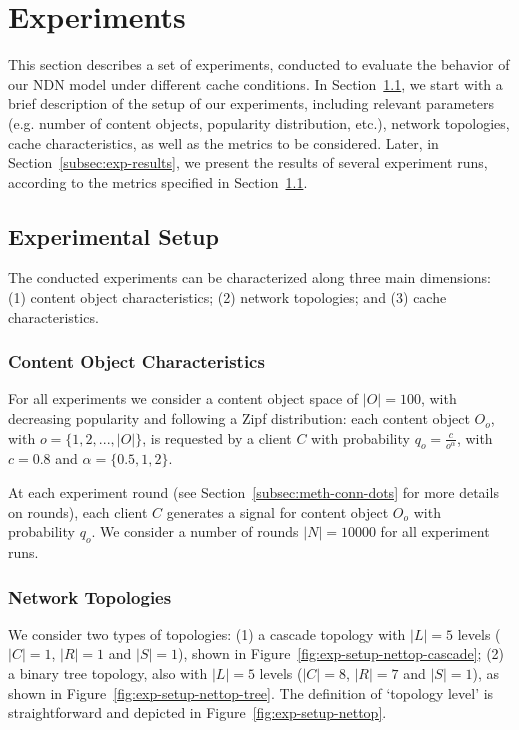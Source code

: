 \section{Experiments}
\label{sec:experiments}

This section describes a set of experiments, conducted to evaluate 
the behavior of our NDN model under different cache conditions. In 
Section~\ref{subsec:exp-setup}, we start 
with a brief description of the setup of our experiments, 
including relevant parameters (e.g. number of content objects, popularity 
distribution, etc.), network topologies, cache characteristics, as well as the 
metrics to be considered. Later, in Section~\ref{subsec:exp-results}, we 
present the results of several experiment runs, according to the metrics 
specified in Section~\ref{subsec:exp-setup}.

\subsection{Experimental Setup}
\label{subsec:exp-setup}

The conducted experiments can be characterized along three main dimensions: (1) 
content object characteristics; (2) network topologies; and (3) cache 
characteristics.\shortvertbreak

\subsubsection{Content Object Characteristics}
\label{subsec:exp-setup-cobj}

For all experiments we consider a content object space of 
$|O| = 100$, with decreasing popularity and following a Zipf distribution: 
each content object $O_o$, with $o = \{1,2,...,|O|\}$, is requested by a client 
$C$ with probability $q_{o} = \frac{c}{o^{\alpha}}$, with $c = 0.8$ and 
$\alpha = \{0.5, 1, 2\}$.\shortvertbreak

At each experiment round (see Section~\ref{subsec:meth-conn-dots} for more details on 
rounds), each client $C$ generates a signal for content object $O_o$ with 
probability $q_{o}$. We consider a number of rounds 
$|N| = 10000$ for all experiment runs.\shortvertbreak

\subsubsection{Network Topologies}
\label{subsec:exp-setup-nettop}

We consider two types of topologies: (1) a cascade topology with $|L| = 5$ levels 
($|C| = 1$, $|R| = 1$ and $|S| = 1$), shown in Figure~\ref{fig:exp-setup-nettop-cascade}; (2) a binary 
tree topology, also with $|L| = 5$ levels ($|C| = 8$, $|R| = 7$ and $|S| = 1$), as 
shown in Figure~\ref{fig:exp-setup-nettop-tree}. The definition of `topology level' is straightforward and depicted 
in Figure~\ref{fig:exp-setup-nettop}.\shortvertbreak

